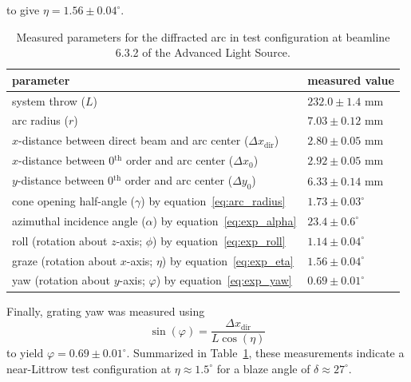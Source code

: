 \documentclass{aastex63}
\begin{document}
to give $\eta = 1.56 \pm 0.04^{\circ}$. 
\begin{table}[]
\centering
\begin{tabular}{@{}ll@{}}
\toprule
parameter                                                                 & measured value             \\ \midrule
system throw ($L$)                                                        & $232.0 \pm 1.4$ mm     \\
arc radius ($r$)                                                          & $7.03 \pm 0.12$ mm       \\
$x$-distance between direct beam and arc center ($\Delta x_{\text{dir}}$) & $2.80 \pm 0.05$ mm       \\
$x$-distance between 0$^{\text{th}}$ order and arc center ($\Delta x_0$)  & $2.92 \pm 0.05$ mm       \\
$y$-distance between 0$^{\text{th}}$ order and arc center ($\Delta y_0$)  & $6.33 \pm 0.14$ mm       \\ \midrule
cone opening half-angle ($\gamma$) by equation~\ref{eq:arc_radius}        & $1.73 \pm 0.03^{\circ}$  \\
azimuthal incidence angle ($\alpha$) by equation~\ref{eq:exp_alpha}       & $23.4 \pm 0.6^{\circ}$ \\ \midrule
roll (rotation about $z$-axis; $\phi$) by equation~\ref{eq:exp_roll}      & $1.14 \pm 0.04^{\circ}$  \\
graze (rotation about $x$-axis; $\eta$) by equation~\ref{eq:exp_eta}      & $1.56 \pm 0.04^{\circ}$  \\
yaw (rotation about $y$-axis; $\varphi$) by equation~\ref{eq:exp_yaw}     & $0.69 \pm 0.01^{\circ}$  \\ \bottomrule
\end{tabular}
\caption{Measured parameters for the diffracted arc in test configuration at beamline 6.3.2 of the Advanced Light Source.}\label{tab:arc_params}
\end{table}
Finally, grating yaw was measured using 
\begin{equation}\label{eq:exp_yaw}
 \sin \left( \varphi \right) = \frac{\Delta x_{\text{dir}}}{L \cos \left( \eta \right)}
 \end{equation}
to yield $\varphi = 0.69 \pm 0.01^{\circ}$. 
Summarized in Table~\ref{tab:arc_params}, these measurements indicate a near-Littrow test configuration at $\eta \approx 1.5^{\circ}$ for a blaze angle of $\delta \approx 27^{\circ}$.%
\end{document}
